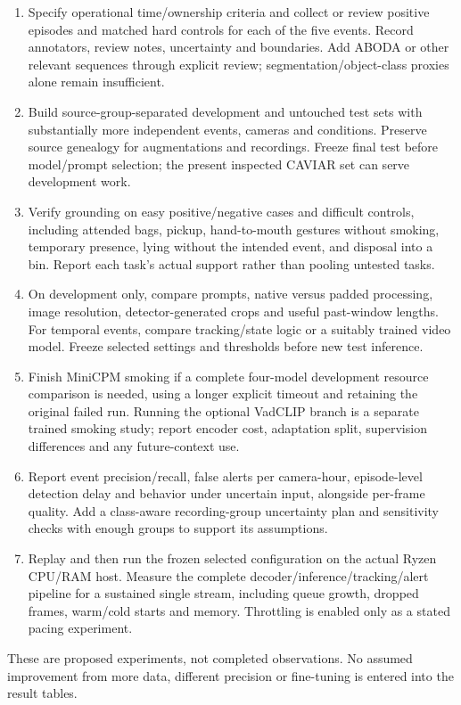 \documentclass[11pt,a4paper]{article}
\begin{document}
\begin{enumerate}
\item Specify operational time/ownership criteria and collect or review positive episodes and matched hard controls for each of the five events. Record annotators, review notes, uncertainty and boundaries. Add ABODA or other relevant sequences through explicit review; segmentation/object-class proxies alone remain insufficient.
\item Build source-group-separated development and untouched test sets with substantially more independent events, cameras and conditions. Preserve source genealogy for augmentations and recordings. Freeze final test before model/prompt selection; the present inspected CAVIAR set can serve development work.
\item Verify grounding on easy positive/negative cases and difficult controls, including attended bags, pickup, hand-to-mouth gestures without smoking, temporary presence, lying without the intended event, and disposal into a bin. Report each task's actual support rather than pooling untested tasks.
\item On development only, compare prompts, native versus padded processing, image resolution, detector-generated crops and useful past-window lengths. For temporal events, compare tracking/state logic or a suitably trained video model. Freeze selected settings and thresholds before new test inference.
\item Finish MiniCPM smoking if a complete four-model development resource comparison is needed, using a longer explicit timeout and retaining the original failed run. Running the optional VadCLIP branch is a separate trained smoking study; report encoder cost, adaptation split, supervision differences and any future-context use.
\item Report event precision/recall, false alerts per camera-hour, episode-level detection delay and behavior under uncertain input, alongside per-frame quality. Add a class-aware recording-group uncertainty plan and sensitivity checks with enough groups to support its assumptions.
\item Replay and then run the frozen selected configuration on the actual Ryzen CPU/RAM host. Measure the complete decoder/inference/tracking/alert pipeline for a sustained single stream, including queue growth, dropped frames, warm/cold starts and memory. Throttling is enabled only as a stated pacing experiment.
\end{enumerate}
These are proposed experiments, not completed observations. No assumed improvement from more data, different precision or fine-tuning is entered into the result tables.
\end{document}
